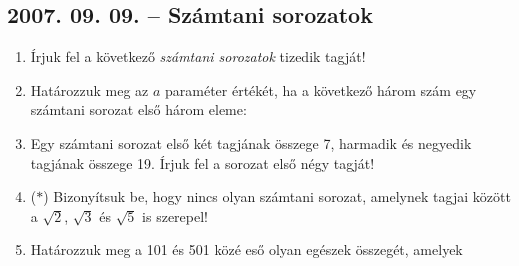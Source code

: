 \subsection*{2007. 09. 09. --  Számtani sorozatok}
\begin{enumerate}
\item Írjuk fel a következő \textit{számtani sorozatok} tizedik tagját!

\item Határozzuk meg az $a$ paraméter értékét, ha a következő három szám egy számtani sorozat első három eleme:

\item Egy számtani sorozat első két tagjának összege 7, harmadik és negyedik tagjának összege 19. Írjuk fel a sorozat első négy tagját!

\item ($*$) Bizonyítsuk be, hogy nincs olyan számtani sorozat, amelynek tagjai között a
$\sqrt 2$, $\sqrt 3$ és $\sqrt 5$ is szerepel!

\item Határozzuk meg a 101 és 501 közé eső olyan egészek összegét, amelyek
\end{enumerate}


